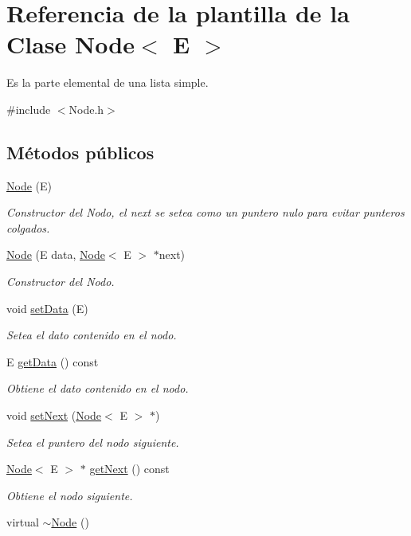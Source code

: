 \hypertarget{classNode}{\section{Referencia de la plantilla de la Clase Node$<$ E $>$}
\label{classNode}
}


Es la parte elemental de una lista simple.  




{\ttfamily \#include $<$Node.\-h$>$}

\subsection*{Métodos públicos}
\begin{DoxyCompactItemize}
\item 
\hyperlink{classNode_a74d41f93c30d8c3036d24894f0e4314e}{Node} (E)
\begin{DoxyCompactList}\small\item\em Constructor del Nodo, el next se setea como un puntero nulo para evitar punteros colgados. \end{DoxyCompactList}\item 
\hyperlink{classNode_adc1b4c81c3fb6d0580f138650629a41e}{Node} (E data, \hyperlink{classNode}{Node}$<$ E $>$ $\ast$next)
\begin{DoxyCompactList}\small\item\em Constructor del Nodo. \end{DoxyCompactList}\item 
void \hyperlink{classNode_ae13418a552fa36eddbaa5dfb767aa664}{set\-Data} (E)
\begin{DoxyCompactList}\small\item\em Setea el dato contenido en el nodo. \end{DoxyCompactList}\item 
E \hyperlink{classNode_a02a4e5126542aaa1a2150932cfa2b8ce}{get\-Data} () const 
\begin{DoxyCompactList}\small\item\em Obtiene el dato contenido en el nodo. \end{DoxyCompactList}\item 
void \hyperlink{classNode_a2ce12b4f2605972720e1c56fe80014a0}{set\-Next} (\hyperlink{classNode}{Node}$<$ E $>$ $\ast$)
\begin{DoxyCompactList}\small\item\em Setea el puntero del nodo siguiente. \end{DoxyCompactList}\item 
\hyperlink{classNode}{Node}$<$ E $>$ $\ast$ \hyperlink{classNode_aeb063e5172867e988550ab7d6c280db7}{get\-Next} () const 
\begin{DoxyCompactList}\small\item\em Obtiene el nodo siguiente. \end{DoxyCompactList}\item 
\hypertarget{classNode_af907944256d9fca41c6a1c783a3a6536}{virtual \hyperlink{classNode_af907944256d9fca41c6a1c783a3a6536}{$\sim$\-Node} ()}\label{classNode_af907944256d9fca41c6a1c783a3a6536}


\end{DoxyCompactItemize}
